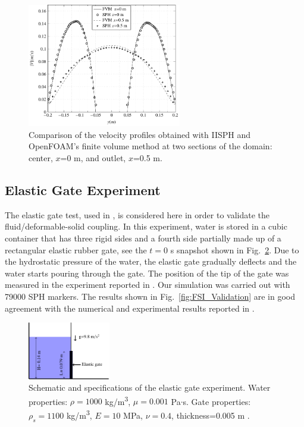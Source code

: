 %
\begin{figure}[H]
	\begin{center}
		\includegraphics[width=0.6\textwidth]{images/IISPH/tikz/FOC.png}
	\end{center}
	\caption{Comparison of the velocity profiles obtained with IISPH and OpenFOAM's finite volume method at two sections of the domain: center, $x$=0 \si{m}, and outlet, $x$=0.5 \si{m}.}
	\label{fig:FOC_profiles}
\end{figure}

\subsection{Elastic Gate Experiment}
The elastic gate test, used in \cite{Antoci2007,yang2012,jahanbakhsh2015}, is considered here in order to validate the fluid/deformable-solid coupling. In this experiment, water is stored in a cubic container that has three rigid sides and a fourth side partially made up of a rectangular elastic rubber gate, see the $t=0$ \si{s} snapshot shown in Fig.~\ref{fig:Elastic_Gate_Schematic}. Due to the hydrostatic pressure of the water, the elastic gate gradually deflects and the water starts pouring through the gate. The position of the tip of the gate was measured in the experiment reported in \cite{Antoci2007}. Our simulation was carried out with \num{79000} SPH markers. The results shown in Fig.~\ref{fig:FSI_Validation} are in good agreement with the numerical and experimental results reported in \cite{Antoci2007}. 

%
\begin{figure}[H]
	\begin{center}
		\includegraphics[width=0.32\textwidth]{images/IISPH/tikz/Elastic_Gate_Schematic.png}
	\end{center}
	\caption{Schematic and specifications of the elastic gate experiment. Water properties: $\rho=1000$ \si{kg/m^3}, $\mu=0.001$ \si{Pa}$\cdot$\si{s}. Gate properties: $\rho_s=1100$ \si{kg/m^3}, $E=10$ \si{MPa}, $\nu=0.4$, thickness=0.005 \si{m} \cite{Antoci2007}.}
	\label{fig:Elastic_Gate_Schematic}
\end{figure}

